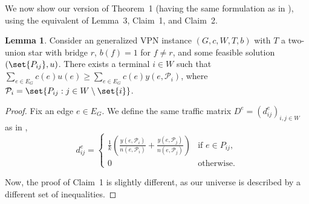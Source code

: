 \documentclass[11pt]{article}
\theoremstyle{definition}
\newtheorem{lemma}{Lemma}
\begin{document}
    We now show our version of Theorem~1 (having the same formulation as in \cite{grandoni2008short}), using the equivalent of Lemma~3, Claim~1, and Claim~2.

    \renewcommand\thelemma{3}
    \begin{lemma}
        Consider an generalized VPN instance $(G, c, W, T, b)$ with $T$ a two-union star with bridge $r$, $b(f) = 1$ for $f \neq r$, and some feasible solution $(\set{P_{ij}}, u)$.
        There exists a terminal $i \in W$ such that $\sum_{e \in E_G} c(e) u(e) \ge \sum_{e \in E_G} c(e) y(e, \mathcal P_i)$, where $\mathcal P_i = \set{P_{ij} : j \in W \setminus \set{i}}$.
    \end{lemma}
    \begin{proof}
        Fix an edge $e \in E_G$.
        We define the same traffic matrix $D^e = (d^e_{ij})_{i,j \in W}$ as in \cite{grandoni2008short},
        \[
            d^e_{ij} = \begin{cases}
                           \frac 1 k \left( \frac{y(e, \mathcal P_i)}{n(e, \mathcal P_i)} + \frac{y(e, \mathcal P_j)}{n(e, \mathcal P_j)} \right) & \text{if $e \in P_{ij}$,} \\
                           0 & \text{otherwise.}
            \end{cases}
        \]

        Now, the proof of Claim~1 is slightly different, as our universe is described by a different set of inequalities.


\end{proof}
\end{document}
